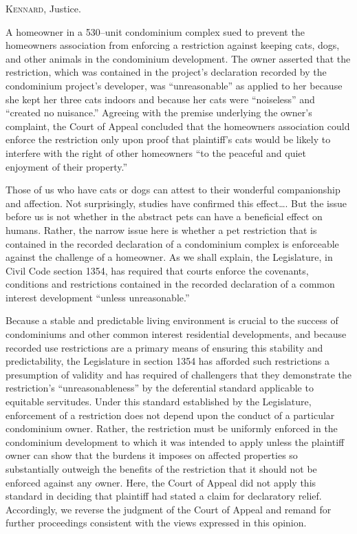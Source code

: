 

\opinion \textsc{Kennard}, Justice.

A homeowner in a 530--unit condominium complex sued to prevent the homeowners
association from enforcing a restriction against keeping cats, dogs, and other
animals in the condominium development. The owner asserted that the restriction,
which was contained in the project's declaration recorded by the condominium
project's developer, was ``unreasonable'' as applied to her because she kept her
three cats indoors and because her cats were ``noiseless'' and ``created no
nuisance.'' Agreeing with the premise underlying the owner's complaint, the
Court of Appeal concluded that the homeowners association could enforce the
restriction only upon proof that plaintiff's cats would be likely to interfere
with the right of other homeowners ``to the peaceful and quiet enjoyment of
their property.''

Those of us who have cats or dogs can attest to their wonderful companionship
and affection. Not surprisingly, studies have confirmed this effect\ldots . But
the issue before us is not whether in the abstract pets can have a beneficial
effect on humans. Rather, the narrow issue here is whether a pet restriction
that is contained in the recorded declaration of a condominium complex is
enforceable against the challenge of a homeowner. As we shall explain, the
Legislature, in Civil Code section 1354, has required that courts enforce the
covenants, conditions and restrictions contained in the recorded declaration of
a common interest development ``unless unreasonable.''

Because a stable and predictable living environment is crucial to the success of
condominiums and other common interest residential developments, and because
recorded use restrictions are a primary means of ensuring this stability and
predictability, the Legislature in section 1354 has afforded such restrictions a
presumption of validity and has required of challengers that they demonstrate
the restriction's ``unreasonableness'' by the deferential standard applicable to
equitable servitudes. Under this standard established by the Legislature,
enforcement of a restriction does not depend upon the conduct of a particular
condominium owner. Rather, the restriction must be uniformly enforced in the
condominium development to which it was intended to apply unless the plaintiff
owner can show that the burdens it imposes on affected properties so
substantially outweigh the benefits of the restriction that it should not be
enforced against any owner. Here, the Court of Appeal did not apply this
standard in deciding that plaintiff had stated a claim for declaratory relief.
Accordingly, we reverse the judgment of the Court of Appeal and remand for
further proceedings consistent with the views expressed in this opinion.

